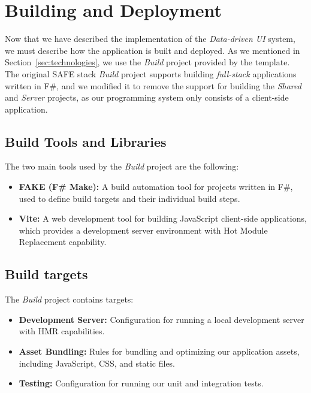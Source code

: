 \section{Building and Deployment}

Now that we have described the implementation of the \emph{Data-driven UI} system, we must describe how the application is built and deployed.
As we mentioned in Section~\ref{sec:technologies}, we use the \emph{Build} project provided by the \citet{safestack} template.
The original SAFE stack \emph{Build} project supports building \emph{full-stack} applications written in F\#, and we modified it to remove the support for building
the \emph{Shared} and \emph{Server} projects, as our programming system only consists of a client-side application.

\subsection{Build Tools and Libraries}

The two main tools used by the \emph{Build} project are the following:
\begin{itemize}
	\item \textbf{FAKE (F\# Make):} A build automation tool for projects written in F\#, used to define build targets and their individual build steps.
	\item \textbf{Vite:} A web development tool for building JavaScript client-side applications, which provides a development server environment with Hot Module Replacement capability.
\end{itemize}

\subsection{Build targets}

The \emph{Build} project contains  targets:

\begin{itemize}
	\item \textbf{Development Server:} Configuration for running a local development server with HMR capabilities.
	\item \textbf{Asset Bundling:} Rules for bundling and optimizing our application assets, including JavaScript, CSS, and static files.
	\item \textbf{Testing:} Configuration for running our unit and integration tests.

\end{itemize}




